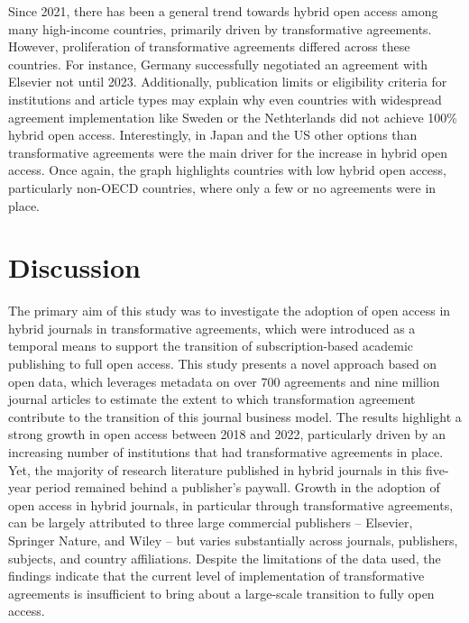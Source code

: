 \documentclass[a4paper,man,floatsintext,longtable,noextraspace,12pt]{apa6}
\begin{document}
Since 2021, there has been a general trend towards hybrid open access
among many high-income countries, primarily driven by transformative
agreements. However, proliferation of transformative agreements differed
across these countries. For instance, Germany successfully negotiated an
agreement with Elsevier not until 2023. Additionally, publication limits
or eligibility criteria for institutions and article types may explain
why even countries with widespread agreement implementation like Sweden
or the Nethterlands did not achieve 100\% hybrid open access.
Interestingly, in Japan and the US other options than transformative
agreements were the main driver for the increase in hybrid open access.
Once again, the graph highlights countries with low hybrid open access,
particularly non-OECD countries, where only a few or no agreements were
in place.

\hypertarget{discussion}{%
\section{Discussion}\label{discussion}}

The primary aim of this study was to investigate the adoption of open
access in hybrid journals in transformative agreements, which were
introduced as a temporal means to support the transition of
subscription-based academic publishing to full open access. This study
presents a novel approach based on open data, which leverages metadata
on over 700 agreements and nine million journal articles to estimate the
extent to which transformation agreement contribute to the transition of
this journal business model. The results highlight a strong growth in
open access between 2018 and 2022, particularly driven by an increasing
number of institutions that had transformative agreements in place. Yet,
the majority of research literature published in hybrid journals in this
five-year period remained behind a publisher's paywall. Growth in the
adoption of open access in hybrid journals, in particular through
transformative agreements, can be largely attributed to three large
commercial publishers -- Elsevier, Springer Nature, and Wiley -- but
varies substantially across journals, publishers, subjects, and country
affiliations. Despite the limitations of the data used, the findings
indicate that the current level of implementation of transformative
agreements is insufficient to bring about a large-scale transition to
fully open access.
\end{document}
